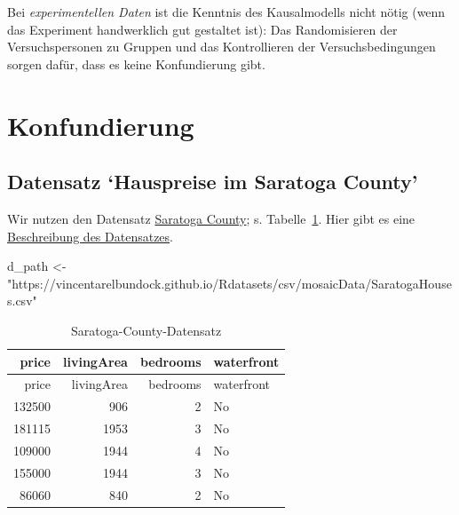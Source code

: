 \documentclass[
  a4paper,
  DIV=11]{scrreprt}
\newenvironment{Shaded}{\begin{snugshade}}{\end{snugshade}}
\newcommand{\NormalTok}[1]{\textcolor[rgb]{0.00,0.23,0.31}{#1}}
\newcommand{\OtherTok}[1]{\textcolor[rgb]{0.00,0.23,0.31}{#1}}
\newcommand{\StringTok}[1]{\textcolor[rgb]{0.13,0.47,0.30}{#1}}
\theoremstyle{definition}
\theoremstyle{remark}
\begin{document}
Bei \emph{experimentellen Daten} ist die Kenntnis des Kausalmodells
nicht nötig (wenn das Experiment handwerklich gut gestaltet ist): Das
Randomisieren der Versuchspersonen zu Gruppen und das Kontrollieren der
Versuchsbedingungen sorgen dafür, dass es keine Konfundierung gibt.

\hypertarget{konfundierung}{%
\section{Konfundierung}\label{konfundierung}}

\newcommand{\indep}{\perp \!\!\! \perp}

\hypertarget{datensatz-hauspreise-im-saratoga-county}{%
\subsection{Datensatz `Hauspreise im Saratoga
County'}\label{datensatz-hauspreise-im-saratoga-county}}

Wir nutzen den Datensatz
\href{https://vincentarelbundock.github.io/Rdatasets/csv/mosaicData/SaratogaHouses.csv}{Saratoga
County}; s. Tabelle~\ref{tbl-saratoga}. Hier gibt es eine
\href{https://vincentarelbundock.github.io/Rdatasets/doc/mosaicData/SaratogaHouses.html}{Beschreibung
des Datensatzes}.

\begin{Shaded}
\begin{Highlighting}[]
\NormalTok{d\_path }\OtherTok{\textless{}{-}} \StringTok{"https://vincentarelbundock.github.io/Rdatasets/csv/mosaicData/SaratogaHouses.csv"}
\end{Highlighting}
\end{Shaded}

\hypertarget{tbl-saratoga}{}
\begin{longtable}[]{@{}rrrl@{}}
\caption{\label{tbl-saratoga}Saratoga-County-Datensatz}\tabularnewline
\toprule()
price & livingArea & bedrooms & waterfront \\
\midrule()
\endfirsthead
\toprule()
price & livingArea & bedrooms & waterfront \\
\midrule()
\endhead
132500 & 906 & 2 & No \\
181115 & 1953 & 3 & No \\
109000 & 1944 & 4 & No \\
155000 & 1944 & 3 & No \\
86060 & 840 & 2 & No \\
\bottomrule()
\end{longtable}
\end{document}

